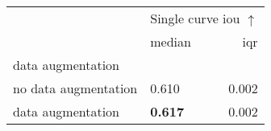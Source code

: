 \begin{tabular}{llr}
\toprule
 & \multicolumn{2}{c}{Single curve \acrshort{iou} $\uparrow$} \\
 & median & \acrshort{iqr} \\
data augmentation &  &  \\
\midrule
no data augmentation & 0.610 & 0.002 \\
data augmentation & \textbf{0.617} & 0.002 \\
\bottomrule
\end{tabular}
